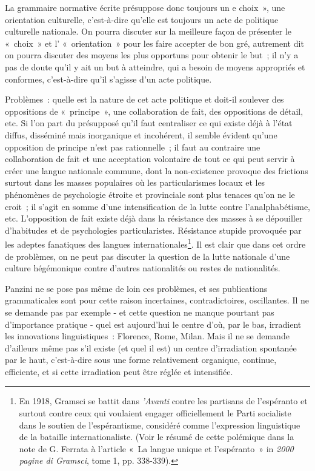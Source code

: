 \documentclass[french,twoside]{book} %
\begin{document}
La grammaire normative écrite présuppose donc toujours un e choix », une orientation culturelle, c’est-à-dire qu’elle est toujours un acte de politique culturelle nationale. On pourra discuter sur la meilleure façon de présenter le « choix » et l’ « orientation » pour les faire accepter de bon gré, autrement dit on pourra discuter des moyens les plus opportuns pour obtenir le but ; il n’y a pas de doute qu’il y ait un but à atteindre, qui a besoin de moyens appropriés et conformes, c’est-à-dire qu’il s’agisse d’un acte politique.\par
Problèmes : quelle est la nature de cet acte politique et doit-il soulever des oppositions de « principe », une collaboration de fait, des oppositions de détail, etc. Si l’on part du présupposé qu’il faut centraliser ce qui existe déjà à l’état diffus, disséminé mais inorganique et incohérent, il semble évident qu’une opposition de principe n’est pas rationnelle ; il faut au contraire une collaboration de fait et une acceptation volontaire de tout ce qui peut servir à créer une langue nationale commune, dont la non-existence provoque des frictions surtout dans les masses populaires où les particularismes locaux et les phénomènes de psychologie étroite et provinciale sont plus tenaces qu’on ne le croit ; il s’agit en somme d’une intensification de la lutte contre l’analphabétisme, etc. L'opposition de fait existe déjà dans la résistance des masses à se dépouiller d’habitudes et de psychologies particularistes. Résistance stupide provoquée par les adeptes fanatiques des langues internationales\footnote{En 1918, Gramsci se battit dans\emph{ 'Avanti} contre les partisans de l’espéranto et surtout contre ceux qui voulaient engager officiellement le Parti socialiste dans le soutien de l’espérantisme, considéré comme l’expression linguistique de la bataille internationaliste. (Voir le résumé de cette polémique dans la note de G. Ferrata à l’article « La langue unique et l’espéranto » in \emph{2000 pagine di Gramsci}, tome 1, pp. 338-339).}. Il est clair que dans cet ordre de problèmes, on ne peut pas discuter la question de la lutte nationale d’une culture hégémonique contre d’autres nationalités ou restes de nationalités.\par
Panzini ne se pose pas même de loin ces problèmes, et ses publications grammaticales sont pour cette raison incertaines, contradictoires, oscillantes. Il ne se demande pas par exemple - et cette question ne manque pourtant pas d’importance pratique - quel est aujourd’hui le centre d’où, par le bas, irradient les innovations linguistiques : Florence, Rome, Milan. Mais il ne se demande d’ailleurs même pas s’il existe (et quel il est) un centre d’irradiation spontanée par le haut, c’est-à-dire sous une forme relativement organique, continue, efficiente, et si cette irradiation peut être réglée et intensifiée.
\end{document}
